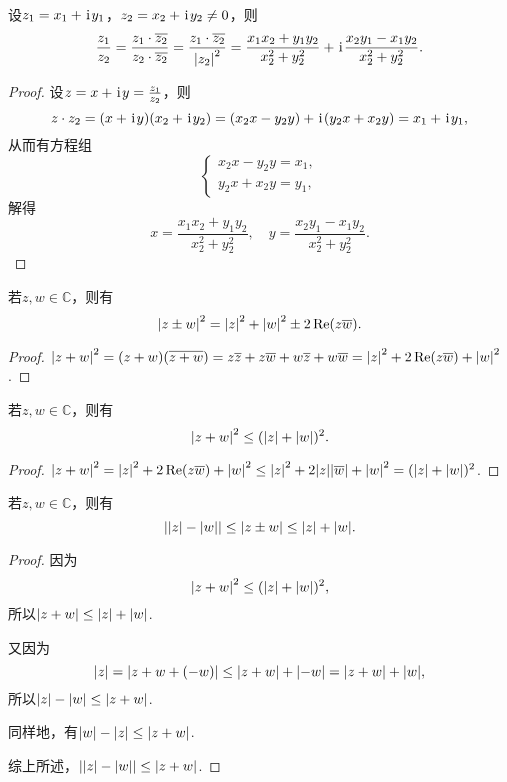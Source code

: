\begin{theorem}
设\(z_1 = x_1 + \kern1pt\mathrm{i}\kern1pt y_1\)，\(z_2 = x_2 + \kern1pt\mathrm{i}\kern1pt y_2 \neq 0\)，则\[
\frac{z_1}{z_2}
= \frac{z_1 \cdot \overline{z_2}}{z_2 \cdot \overline{z_2}}
= \frac{z_1 \cdot \overline{z_2}}{\abs{z_2}^2}
= \frac{x_1 x_2 + y_1 y_2}{x_2^2 + y_2^2}
+ \kern1pt\mathrm{i}\kern1pt \frac{x_2 y_1 - x_1 y_2}{x_2^2 + y_2^2}.
\]
\begin{proof}
设\(z = x + \kern1pt\mathrm{i}\kern1pt y = \frac{z_1}{z_2}\)，则\[
z \cdot z_2 = (x + \kern1pt\mathrm{i}\kern1pt y)(x_2 + \kern1pt\mathrm{i}\kern1pt y_2)
= (x_2 x - y_2 y) + \kern1pt\mathrm{i}\kern1pt(y_2 x + x_2 y)
= x_1 + \kern1pt\mathrm{i}\kern1pt y_1,
\]从而有方程组\[
\left\{ \begin{array}{l}
x_2 x - y_2 y = x_1, \\
y_2 x + x_2 y = y_1,
\end{array} \right.
\]解得\[
x = \frac{x_1 x_2 + y_1 y_2}{x_2^2 + y_2^2},
\quad
y = \frac{x_2 y_1 - x_1 y_2}{x_2^2 + y_2^2}.
\]
\end{proof}
\end{theorem}

\begin{theorem}
若\(z,w \in \mathbb{C}\)，则有\begin{equation}
\abs{z \pm w}^2 = \abs{z}^2 + \abs{w}^2 \pm 2 \Re(z \overline{w}).
\end{equation}
\begin{proof}
\(
\abs{z + w}^2
= (z + w) (\overline{z + w})
= z\overline{z} + z\overline{w} + w\overline{z} + w\overline{w}
= \abs{z}^2 + 2 \Re(z\overline{w}) + \abs{w}^2
\).
\end{proof}
\end{theorem}

\begin{theorem}
若\(z,w \in \mathbb{C}\)，则有\begin{equation}
\abs{z + w}^2 \leq (\abs{z} + \abs{w})^2.
\end{equation}
\begin{proof}
\(
\abs{z + w}^2
= \abs{z}^2 + 2 \Re(z \overline{w}) + \abs{w}^2
\leq \abs{z}^2 + 2 \abs{z}\abs{\overline{w}} + \abs{w}^2
= (\abs{z} + \abs{w})^2
\).
\end{proof}
\end{theorem}

\begin{theorem}[三角不等式]
若\(z,w \in \mathbb{C}\)，则有\begin{equation}
\abs{\abs{z}-\abs{w}} \leq \abs{z \pm w} \leq \abs{z} + \abs{w}.
\end{equation}
\begin{proof}
因为\[
\abs{z + w}^2 \leq (\abs{z} + \abs{w})^2,
\]所以\(\abs{z + w} \leq \abs{z} + \abs{w}\).

又因为\[
\abs{z} = \abs{z + w + (-w)} \leq \abs{z+w} + \abs{-w} = \abs{z+w} + \abs{w},
\]所以\(\abs{z}-\abs{w} \leq \abs{z+w}\).

同样地，有\(\abs{w}-\abs{z} \leq \abs{z+w}\).

综上所述，\(\abs{\abs{z}-\abs{w}}\leq\abs{z+w}\).
\end{proof}
\end{theorem}

